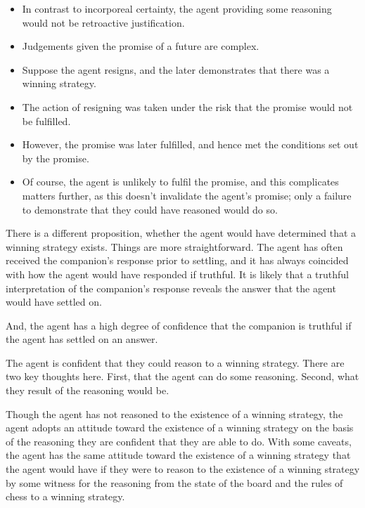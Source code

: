 \documentclass[10pt]{article}
\begin{document}
\begin{itemize}
\item In contrast to incorporeal certainty, the agent providing some reasoning would not be retroactive justification.
\end{itemize}

\begin{itemize}
\item Judgements given the promise of a future are complex.
\item Suppose the agent resigns, and the later demonstrates that there was a winning strategy.
\item The action of resigning was taken under the risk that the promise would not be fulfilled.
\item However, the promise was later fulfilled, and hence met the conditions set out by the promise.
\item Of course, the agent is unlikely to fulfil the promise, and this complicates matters further, as this doesn't invalidate the agent's promise; only a failure to demonstrate that they could have reasoned would do so.
\end{itemize}


There is a different proposition, whether the agent would have determined that a winning strategy exists.
Things are more straightforward.
The agent has often received the companion's response prior to settling, and it has always coincided with how the agent would have responded if truthful.
It is likely that a truthful interpretation of the companion's response reveals the answer that the agent would have settled on.

And, the agent has a high degree of confidence that the companion is truthful if the agent has settled on an answer.

The agent is confident that they could reason to a winning strategy.
There are two key thoughts here.
First, that the agent can do some reasoning.
Second, what they result of the reasoning would be.

Though the agent has not reasoned to the existence of a winning strategy, the agent adopts an attitude toward the existence of a winning strategy on the basis of the reasoning they are confident that they are able to do.
With some caveats, the agent has the same attitude toward the existence of a winning strategy that the agent would have if they were to reason to the existence of a winning strategy by some witness for the reasoning from the state of the board and the rules of chess to a winning strategy.
\end{document}
